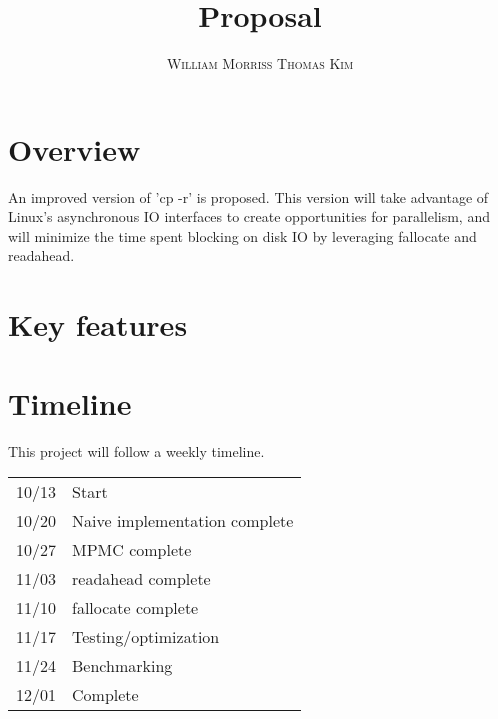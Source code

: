 \documentclass[12pt]{article}
\title{\vspace{-25mm}\fontsize{16pt}{10pt}\selectfont\textbf{Proposal}} %
\author{
  \textsc{William Morriss}
  \textsc{Thomas Kim}
}
\date{}
\begin{document}
\maketitle %

\section{Overview}
An improved version of 'cp -r' is proposed.
This version will take advantage of Linux's asynchronous IO interfaces to create
opportunities for parallelism, and will minimize the time spent blocking on disk
IO by leveraging fallocate and readahead.

\section{Key features}

\section{Timeline}
This project will follow a weekly timeline. \\
\begin{tabular}{|l | l|}
\hline
10/13 & Start \\
10/20 & Naive implementation complete \\
10/27 & MPMC complete \\
11/03 & readahead complete \\
11/10 & fallocate complete \\
11/17 & Testing/optimization \\
11/24 & Benchmarking \\
12/01 & Complete \\
\hline
\end{tabular}


\end{document}
